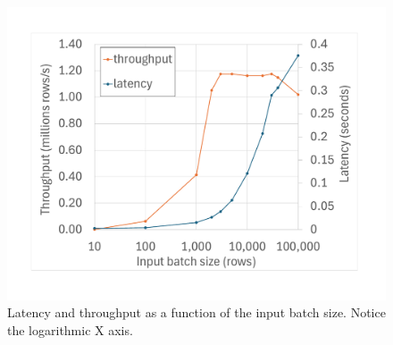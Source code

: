 \begin{figure}[h]
  \includegraphics[width=.90\columnwidth]{graph/batchsize}
  \caption{Latency and throughput as a function of the input batch
    size.  Notice the logarithmic X axis.\label{fig:batchsize}}
\end{figure}

